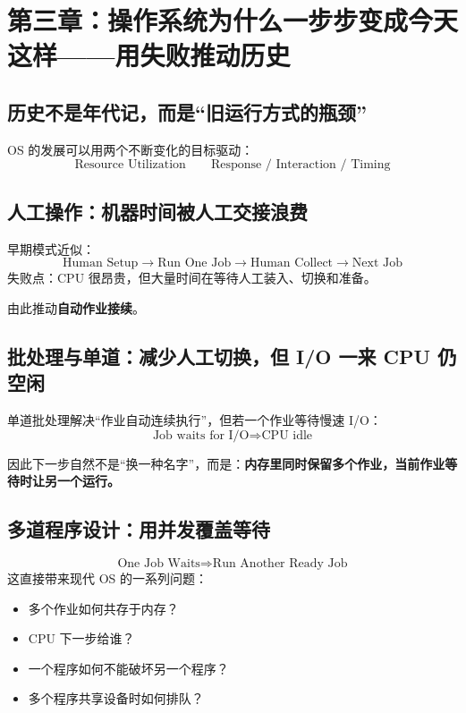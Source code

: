 \documentclass[11pt,a4paper]{ctexart}
\newcommand{\kw}[1]{\textbf{#1}}
\begin{document}
\section{第三章：操作系统为什么一步步变成今天这样——用失败推动历史}

\subsection{历史不是年代记，而是“旧运行方式的瓶颈”}

OS 的发展可以用两个不断变化的目标驱动：
\[
\boxed{\text{Resource Utilization}}\qquad\boxed{\text{Response / Interaction / Timing}}
\]

\subsection{人工操作：机器时间被人工交接浪费}

早期模式近似：
\[
\text{Human Setup}\rightarrow\text{Run One Job}\rightarrow\text{Human Collect}\rightarrow\text{Next Job}
\]
失败点：CPU 很昂贵，但大量时间在等待人工装入、切换和准备。

由此推动\kw{自动作业接续}。

\subsection{批处理与单道：减少人工切换，但 I/O 一来 CPU 仍空闲}

单道批处理解决“作业自动连续执行”，但若一个作业等待慢速 I/O：
\[
\boxed{\text{Job waits for I/O}\Rightarrow\text{CPU idle}}
\]

因此下一步自然不是“换一种名字”，而是：\kw{内存里同时保留多个作业，当前作业等待时让另一个运行。}

\subsection{多道程序设计：用并发覆盖等待}

\[
\boxed{
\text{One Job Waits}
\Rightarrow
\text{Run Another Ready Job}
}
\]
这直接带来现代 OS 的一系列问题：
\begin{itemize}
  \item 多个作业如何共存于内存？
  \item CPU 下一步给谁？
  \item 一个程序如何不能破坏另一个程序？
  \item 多个程序共享设备时如何排队？
\end{itemize}
\end{document}
